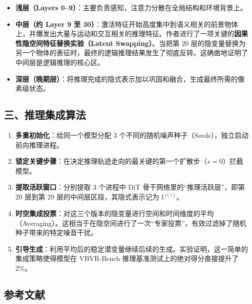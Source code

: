 \begin{itemize}
\tightlist
\item
  \textbf{浅层（Layers 0--9）}：主要负责感知，注意力分散在全局结构和环境背景上。
\item
  \textbf{中层（约 Layer 9 至 30）}：激活特征开始高度集中到语义相关的前景物体上，并爆发出大量与运动和交互相关的推理特征。作者进行了一项关键的\textbf{因果性隐空间特征替换实验（Latent Swapping）}。当把第 20 层的隐变量替换为另一个物体的表征时，最终的逻辑推理结果发生了彻底反转。这确凿地证明了中间层是逻辑推理的核心区。
\item
  \textbf{深层（晚期层）}：将推理完成的隐式表示加以巩固和融合，生成最终所需的像素级状态。
\end{itemize}

\hypertarget{ux4e09ux63a8ux7406ux96c6ux6210ux7b97ux6cd5}{%
\subsection{三、推理集成算法}\label{ux4e09ux63a8ux7406ux96c6ux6210ux7b97ux6cd5}}

\begin{enumerate}
\def\labelenumi{\arabic{enumi}.}
\tightlist
\item
  \textbf{多重初始化}：给同一个模型分配 3 个不同的随机噪声种子（Seeds），独立启动前向推理进程。
\item
  \textbf{锁定关键步骤}：在决定推理轨迹走向的最关键的第一个扩散步（\(s=0\)）拦截模型。
\item
  \textbf{提取活跃窗口}：分别提取 3 个进程中 DiT 骨干网络里的``推理活跃层''，即第 20 层到第 29 层的中间层区段，其隐式表示记为 \(U^{(i)}\)。
\item
  \textbf{时空集成投票}：对这三个版本的隐变量进行空间和时间维度的平均（Averaging）。这相当于在隐空间进行了一次``专家投票''，有效过滤掉了随机种子带来的特定噪音干扰。
\item
  \textbf{引导生成}：利用平均后的稳定潜变量继续后续的生成。实验证明，这一简单的集成策略使得模型在 VBVR-Bench 推理基准测试上的绝对得分直接提升了 2\%。
\end{enumerate}

\hypertarget{ux53c2ux8003ux6587ux732e-145}{%
\subsection{参考文献}\label{ux53c2ux8003ux6587ux732e-145}}

